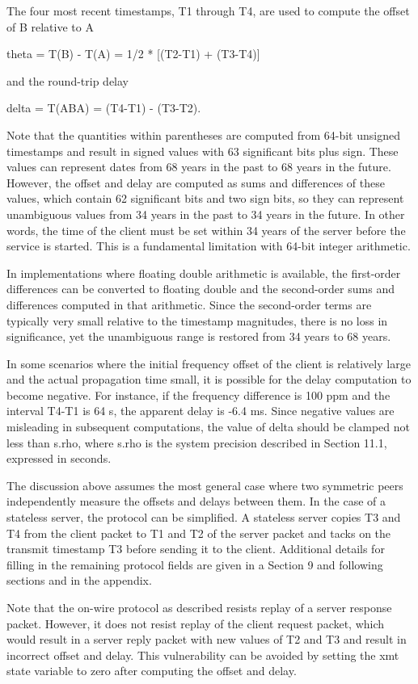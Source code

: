 The four most recent timestamps, T1 through T4, are used to compute
the offset of B relative to A

theta = T(B) - T(A) = 1/2 * [(T2-T1) + (T3-T4)]

and the round-trip delay

delta = T(ABA) = (T4-T1) - (T3-T2).

Note that the quantities within parentheses are computed from 64-bit
unsigned timestamps and result in signed values with 63 significant
bits plus sign. These values can represent dates from 68 years in
the past to 68 years in the future. However, the offset and delay
are computed as sums and differences of these values, which contain
62 significant bits and two sign bits, so they can represent
unambiguous values from 34 years in the past to 34 years in the
future. In other words, the time of the client must be set within 34
years of the server before the service is started. This is a
fundamental limitation with 64-bit integer arithmetic.

In implementations where floating double arithmetic is available, the
first-order differences can be converted to floating double and the
second-order sums and differences computed in that arithmetic. Since
the second-order terms are typically very small relative to the
timestamp magnitudes, there is no loss in significance, yet the
unambiguous range is restored from 34 years to 68 years.

In some scenarios where the initial frequency offset of the client is
relatively large and the actual propagation time small, it is
possible for the delay computation to become negative. For instance,
if the frequency difference is 100 ppm and the interval T4-T1 is 64
s, the apparent delay is -6.4 ms. Since negative values are
misleading in subsequent computations, the value of delta should be
clamped not less than s.rho, where s.rho is the system precision
described in Section 11.1, expressed in seconds.

The discussion above assumes the most general case where two
symmetric peers independently measure the offsets and delays between
them. In the case of a stateless server, the protocol can be
simplified. A stateless server copies T3 and T4 from the client
packet to T1 and T2 of the server packet and tacks on the transmit
timestamp T3 before sending it to the client. Additional details for
filling in the remaining protocol fields are given in a Section 9 and
following sections and in the appendix.

Note that the on-wire protocol as described resists replay of a
server response packet. However, it does not resist replay of the
client request packet, which would result in a server reply packet
with new values of T2 and T3 and result in incorrect offset and
delay. This vulnerability can be avoided by setting the xmt state
variable to zero after computing the offset and delay.
